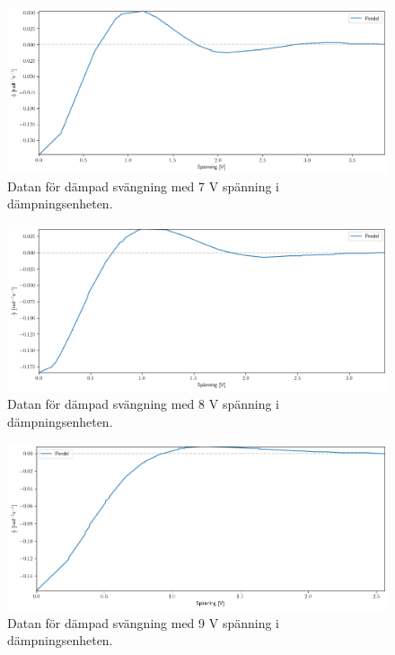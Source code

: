 \documentclass[12pt, a4paper]{article}
\begin{document}
\begin{figure}[hp]
    \includegraphics[width=\textwidth]{graf_7_v_centered}
    \caption{Datan för dämpad svängning med 7 V spänning i dämpningsenheten.}
    \label{fig:data_7_v}
\end{figure}

\begin{figure}[hp]
    \includegraphics[width=\textwidth]{graf_8_v_centered}
    \caption{Datan för dämpad svängning med 8 V spänning i dämpningsenheten.}
    \label{fig:data_8_v}
\end{figure}

\begin{figure}[hp]
    \includegraphics[width=\textwidth]{graf_9_v_centered}
    \caption{Datan för dämpad svängning med 9 V spänning i dämpningsenheten.}
    \label{fig:data_9_v}
\end{figure}
\end{document}
